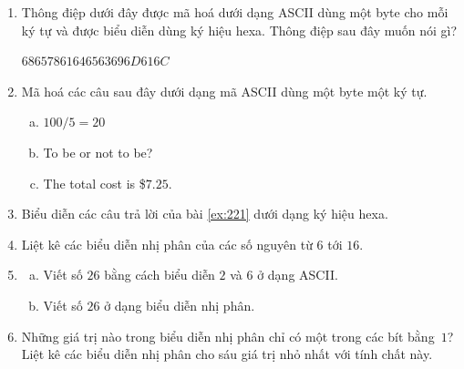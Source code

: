 \begin{multicols}{2}
\begin{enumerate}
  \item Thông điệp dưới đây được mã hoá dưới dạng ASCII dùng một byte cho mỗi ký tự và
    được biểu diễn dùng ký hiệu hexa. Thông điệp sau
    đây muốn nói gì?
    \begin{center}
      $68657861646563696D616C$
    \end{center}
  \item Mã hoá các câu sau đây dưới dạng mã ASCII dùng một byte một ký tự.
\label{ex:221}
    \begin{enumerate}[a.]
    \item $100/5=20$
    \item To be or not to be?
    \item The total cost is \$$7.25$.
    \end{enumerate}
 
  \item Biểu diễn các câu trả lời của bài \ref{ex:221} dưới dạng ký hiệu hexa.

  \item Liệt kê các biểu diễn nhị phân của các số nguyên từ $6$ tới $16$.

  \item \begin{enumerate}[a.]
    \item Viết số $26$ bằng cách biểu diễn $2$ và $6$ ở dạng ASCII.

    \item Viết số $26$ ở dạng biểu diễn nhị phân.
    \end{enumerate}

  \item Những giá trị nào trong biểu diễn nhị phân chỉ có một trong các bít bằng~$1$? Liệt
    kê các biểu diễn nhị phân cho sáu giá trị nhỏ nhất với tính chất này.

  \end{enumerate}

\end{multicols}



